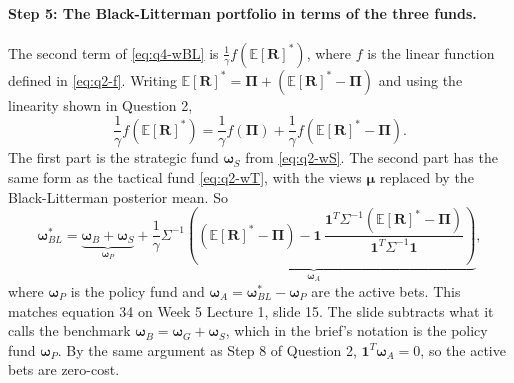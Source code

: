 \documentclass[11pt]{article}
\numberwithin{equation}{section}
\begin{document}
\paragraph{Step 5: The Black-Litterman portfolio in terms of the three funds.}
The second term of \eqref{eq:q4-wBL} is $\frac{1}{\gamma}f(\mathbb{E}[\bm{R}]^{*})$, where $f$ is the linear function defined in \eqref{eq:q2-f}. Writing $\mathbb{E}[\bm{R}]^{*} = \bm{\Pi} + \left(\mathbb{E}[\bm{R}]^{*} - \bm{\Pi}\right)$ and using the linearity shown in Question 2,
\begin{equation*}
  \frac{1}{\gamma}f\left(\mathbb{E}[\bm{R}]^{*}\right) = \frac{1}{\gamma}f\left(\bm{\Pi}\right) + \frac{1}{\gamma}f\left(\mathbb{E}[\bm{R}]^{*} - \bm{\Pi}\right).
\end{equation*}
The first part is the strategic fund $\bm{\omega}_{S}$ from \eqref{eq:q2-wS}. The second part has the same form as the tactical fund \eqref{eq:q2-wT}, with the views $\bm{\mu}$ replaced by the Black-Litterman posterior mean. So
\begin{equation}
  \bm{\omega}^{*}_{BL} = \underbrace{\bm{\omega}_{B} + \bm{\omega}_{S}}_{\bm{\omega}_{P}} + \underbrace{\frac{1}{\gamma}\Sigma^{-1}\left(\left(\mathbb{E}[\bm{R}]^{*} - \bm{\Pi}\right) - \mathbf{1}\,\frac{\mathbf{1}^{T}\Sigma^{-1}\left(\mathbb{E}[\bm{R}]^{*} - \bm{\Pi}\right)}{\mathbf{1}^{T}\Sigma^{-1}\mathbf{1}}\right)}_{\bm{\omega}_{A}},
  \label{eq:q4-split}
\end{equation}
where $\bm{\omega}_{P}$ is the policy fund and $\bm{\omega}_{A} = \bm{\omega}^{*}_{BL} - \bm{\omega}_{P}$ are the active bets. This matches equation 34 on Week 5 Lecture 1, slide 15. The slide subtracts what it calls the benchmark $\bm{\omega}_{B} = \bm{\omega}_{G} + \bm{\omega}_{S}$, which in the brief's notation is the policy fund $\bm{\omega}_{P}$. By the same argument as Step 8 of Question 2, $\mathbf{1}^{T}\bm{\omega}_{A} = 0$, so the active bets are zero-cost.
\end{document}
